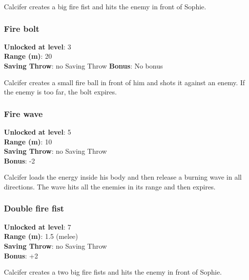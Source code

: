 Calcifer creates a big fire fist and hits the enemy in front of Sophie.

\subsubsection{Fire bolt}
\textbf{Unlocked at level}: 3 \\
\textbf{Range (m)}: 20 \\
\textbf{Saving Throw}: no Saving Throw
\textbf{Bonus}: No bonus

Calcifer creates a small fire ball in front of him and shots it against an enemy. If the enemy is too far, the bolt expires.

\subsubsection{Fire wave}
\textbf{Unlocked at level}: 5 \\
\textbf{Range (m)}: 10 \\
\textbf{Saving Throw}: no Saving Throw \\
\textbf{Bonus}: -2

Calcifer loads the energy inside his body and then release a burning wave in all directions. The wave hits all the enemies in its range and then expires.

\subsubsection{Double fire fist}
\textbf{Unlocked at level}: 7 \\
\textbf{Range (m)}: 1.5 (melee) \\
\textbf{Saving Throw}: no Saving Throw \\
\textbf{Bonus}: +2

Calcifer creates a two big fire fists and hits the enemy in front of Sophie.

